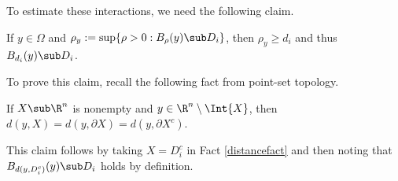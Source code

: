 \documentclass[../main.tex]{subfiles}
\begin{document}

To estimate these interactions, we need the following claim. %
\begin{claim}
    If $ y\in \Omega $ and $ \rho_{y}:= \sup\{\rho>0: B_{\rho}(y)\sub D_{i}\} $, then $ \rho_{y}\geq d_{i} $ and thus $ B_{d_{i}}(y)\sub D_{i} $.
\end{claim}

To prove this claim, recall the following fact from point-set topology. 
\begin{fact}\label{distancefact}
    If $ X\sub \R^{n} $ is nonempty and $ y\in \R^{n}\setminus\Int{X} $, then $ d(y,X) = d(y,\partial X) = d(y, \partial X^{c})$.
\end{fact}
This claim follows by taking $ X=D_{i}^{c} $ in Fact \ref{distancefact} and then noting that $ B_{d(y,D_{i}^{c})}(y)\sub D_{i} $ holds by definition.
\end{document}
